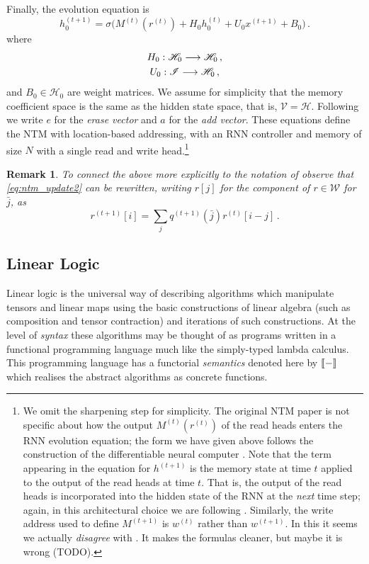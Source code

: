 \documentclass[english,letter paper,12pt,leqno]{article}
\theoremstyle{example}
\newtheorem{remark}[theorem]{Remark}
\numberwithin{equation}{section}
\def\be{\begin{equation}}
\def\ee{\end{equation}}
\begin{document}
Finally, the evolution equation is
\be\label{eq:NTMequation}
h_0^{(t+1)} = \sigma\Big( M^{(t)}(r^{(t)}) + H_0 h_0^{(t)} + U_0 x^{(t+1)} + B_0 \Big)\,.
\ee 
where
\begin{gather*}
H_0: \mathscr{H}_0 \longrightarrow \mathscr{H}_0\,,\\
U_0: \mathscr{I} \longrightarrow \mathscr{H}_0\,,
\end{gather*}
and $B_0 \in \mathscr{H}_0$ are weight matrices. We assume for simplicity that the memory coefficient space is the same as the hidden state space, that is, $\mathscr{V} = \mathscr{H}$. Following \cite[\S 3.2]{ntm} we write $e$ for the \emph{erase vector} and $a$ for the \emph{add vector}. These equations define the NTM with location-based addressing, with an RNN controller and memory of size $N$ with a single read and write head.\footnote{We omit the sharpening step \cite[Eq. (9)]{ntm} for simplicity. The original NTM paper \cite{ntm} is not specific about how the output $M^{(t)}(r^{(t)})$ of the read heads enters the RNN evolution equation; the form we have given above follows the construction of the differentiable neural computer \cite[p. 7]{dnc}. Note that the term appearing in the equation for $h^{(t+1)}$ is the memory state at time $t$ applied to the output of the read heads at time $t$. That is, the output of the read heads is incorporated into the hidden state of the RNN at the \emph{next} time step; again, in this architectural choice we are following \cite{dnc}. Similarly, the write address used to define $M^{(t+1)}$ is $w^{(t)}$ rather than $w^{(t+1)}$. In this it seems we actually \emph{disagree} with \cite{ntm,dnc}. It makes the formulas cleaner, but maybe it is wrong (TODO). }

\begin{remark} To connect the above more explicitly to the notation of \cite[Eq. (8)]{ntm} observe that \eqref{eq:ntm_update2} can be rewritten, writing $r[j]$ for the component of $r \in \mathscr{W}$ for $\bar{j}$, as
\be\label{eq:moreexplicah}
r^{(t+1)}[i] = \sum_j q^{(t+1)}(\bar{j}) r^{(t)}[i-j]\,.
\ee
\end{remark}

\subsection{Linear Logic}

Linear logic is the universal way of describing algorithms which manipulate tensors and linear maps using the basic constructions of linear algebra (such as composition and tensor contraction) and iterations of such constructions. At the level of \emph{syntax} these algorithms may be thought of as programs written in a functional programming language much like the simply-typed lambda calculus. This programming language has a functorial \emph{semantics} denoted here by $\llbracket - \rrbracket$ which realises the abstract algorithms as concrete functions.
\end{document}
